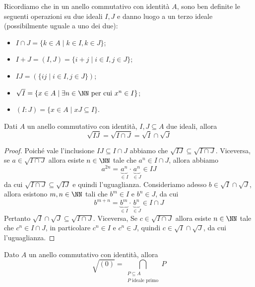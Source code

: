 \documentclass[11pt]{scrartcl}
\begin{document}
	Ricordiamo che in un anello commutativo con identità $A$, sono ben definite
	le seguenti operazioni su due ideali $I, J$ e danno luogo a un terzo ideale
	(possibilmente uguale a uno dei due):
	\begin{itemize}
		\item $I\cap J = \{k \in A \mid k \in I, k \in J\}$;
		\item $I + J = (I, J) = \{i + j \mid i \in I, j \in J\}$;
		\item $IJ = (\{ij\mid i \in I, j \in J\})$;
		\item $\sqrt{I} = \{x \in A \mid \exists n \in \NN \text{ per cui } x^n \in I\}$;
		\item $(I : J) = \{x \in A \mid xJ \subseteq I\}$.
	\end{itemize}
	
	\begin{proposition}
		Dati $A$ un anello commutativo con identità, $I, J \subseteq A$ due ideali,
		allora
		\[
		\sqrt{IJ} = \sqrt{I\cap J} = \sqrt{I}\cap \sqrt{J}
		\]
	\end{proposition}
	
	\begin{proof}
		Poiché vale l'inclusione $IJ \subseteq I\cap J$ abbiamo che $\sqrt{IJ}
		\subseteq \sqrt{I\cap J}$. Viceversa, se $a \in \sqrt{I\cap J}$ allora
		esiste $n \in \NN$ tale che $a^n \in I\cap J$, allora abbiamo 
		\[
		a^{2n} = \underset{\in I}{\underbrace{a^n}} \cdot \underset{\in J}{\underbrace{a^n}}
		\in IJ
		\]
		da cui $\sqrt{I\cap J} \subseteq \sqrt{IJ}$ e quindi l'uguaglianza.\newline
		Consideriamo adesso $b \in \sqrt{I}\cap \sqrt{J}$, allora esistono $m, n \in \NN$
		tali che $b^m \in I$ e $b^n \in J$, da cui
		\[
		b^{m + n} = \underset{\in I}{\underbrace{b^m}}\cdot
		\underset{\in J}{\underbrace{b^n}} \in I\cap J
		\]
		Pertanto $\sqrt{I}\cap \sqrt{J} \subseteq \sqrt{I\cap J}$. Viceversa, Se
		$c \in \sqrt{I\cap J}$ allora esiste $n \in \NN$ tale che $c^n \in I\cap J$, 
		in particolare $c^n \in I$ e $c^n \in J$, quindi $c \in \sqrt{I}\cap\sqrt{J}$,
		da cui l'uguaglianza.
	\end{proof}
	
	\begin{proposition}
		\label{prop2.9}
		Dato $A$ un anello commutativo con identità, allora
		\[
		\sqrt{(0)} = \bigcap_{\substack{P\subseteq A\\ P \text{ ideale primo}}}P
		\]
	\end{proposition}
	
\end{document}
